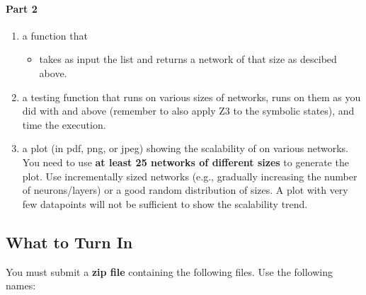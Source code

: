 \paragraph{Part 2}
\begin{enumerate}
\item a function  that
\begin{itemize}
    \item takes as input the list  and returns a network of that size as descibed above.
\end{itemize}
\item a testing function  that runs  on various sizes of networks, runs  on them as you did with  and  above (remember to also apply Z3 to the symbolic states), and time the execution.
\item a plot (in pdf, png, or jpeg) showing the scalability of  on various networks. You need to use \textbf{at least 25 networks of different sizes} to generate the plot. Use incrementally sized networks (e.g., gradually increasing the number of neurons/layers) or a good random distribution of sizes. A plot with very few datapoints will not be sufficient to show the scalability trend.

\end{enumerate}

\subsection{What to Turn In}

You must submit a \textbf{zip file} containing the following files. Use the following names:

